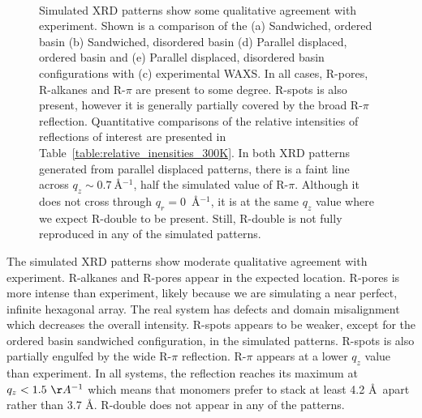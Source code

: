 \documentclass[journal=jpcbfk,manuscript=article]{achemso}
\begin{document}
\begin{figure}[!htb]
\begin{subfigure}{0.1\textwidth}
	\end{subfigure}	
	\caption{Simulated XRD patterns show some qualitative agreement with experiment. Shown is a 
	comparison of the (a) Sandwiched, ordered basin (b) Sandwiched,
	disordered basin (d) Parallel displaced, ordered basin and (e) Parallel displaced, disordered basin 
	configurations with (c) experimental WAXS. 	In all cases, R-pores, R-alkanes and R-$\pi$ are 
	present to some degree. R-spots is also present, however it is generally partially covered by the
	broad R-$\pi$ reflection. Quantitative comparisons of the relative intensities of reflections of
	interest are presented in Table~\ref{table:relative_inensities_300K}. In both XRD patterns generated
	from parallel displaced patterns, there is a faint line across $q_z \sim 0.7~$\AA$^{-1}$, half
	the simulated value of R-$\pi$. Although it does not cross through $q_r = 0$~\AA$^{-1}$, it is at 
	the same $q_z$ value where we expect R-double to be present. Still, R-double is not fully reproduced
	in any of the simulated patterns.}~\label{fig:XRDsim} 
  \end{figure}
  
  The simulated XRD patterns show moderate qualitative agreement with experiment. R-alkanes and
  R-pores appear in the expected location. R-pores is more intense than experiment, likely
  because we are simulating a near perfect, infinite hexagonal array. The real system has 
  defects and domain misalignment which decreases the overall intensity.
  R-spots appears to be weaker, except for the ordered basin sandwiched configuration, in the 
  simulated patterns. R-spots is also partially engulfed by the wide R-$\pi$ reflection. R-$\pi$
  appears at a lower $q_z$ value than experiment. In all systems, the reflection reaches its 
  maximum at $q_z < 1.5~\AA^{-1}$ which means that monomers prefer to stack at least 4.2 \AA~apart
  rather than 3.7 \AA. R-double does not appear in any of the patterns. 
  
  
\end{document}
